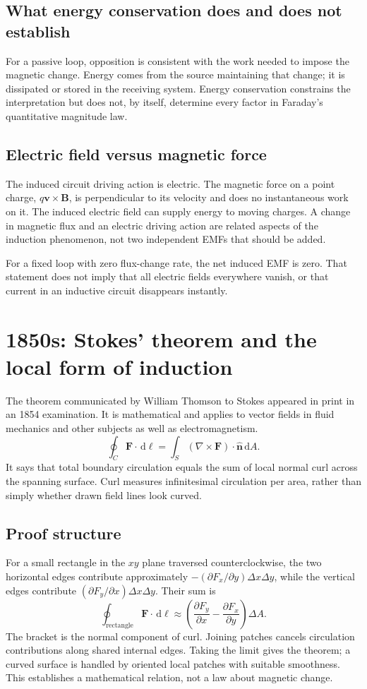 \documentclass[11pt,letterpaper]{article}
\newcommand{\vect}[1]{\boldsymbol{#1}}
\newcommand{\dd}{\,\mathrm d}
\begin{document}
\subsection*{What energy conservation does and does not establish}
For a passive loop, opposition is consistent with the work needed to impose the magnetic change. Energy comes from the source maintaining that change; it is dissipated or stored in the receiving system. Energy conservation constrains the interpretation but does not, by itself, determine every factor in Faraday's quantitative magnitude law.

\subsection*{Electric field versus magnetic force}
The induced circuit driving action is electric. The magnetic force on a point charge, $q\vect v\times\vect B$, is perpendicular to its velocity and does no instantaneous work on it. The induced electric field can supply energy to moving charges. A change in magnetic flux and an electric driving action are related aspects of the induction phenomenon, not two independent EMFs that should be added.

For a fixed loop with zero flux-change rate, the net induced EMF is zero. That statement does not imply that all electric fields everywhere vanish, or that current in an inductive circuit disappears instantly.

\newpage
\section{1850s: Stokes' theorem and the local form of induction}
The theorem communicated by William Thomson to Stokes appeared in print in an 1854 examination. It is mathematical and applies to vector fields in fluid mechanics and other subjects as well as electromagnetism.\cite{tong}
\begin{equation}
\boxed{\oint_C\vect F\cdot\dd\vect\ell
=\int_S(\nabla\times\vect F)\cdot\hat{\vect n}\dd A.}
\end{equation}
It says that total boundary circulation equals the sum of local normal curl across the spanning surface. Curl measures infinitesimal circulation per area, rather than simply whether drawn field lines look curved.

\subsection*{Proof structure}
For a small rectangle in the $xy$ plane traversed counterclockwise, the two horizontal edges contribute approximately $-(\partial F_x/\partial y)\Delta x\Delta y$, while the vertical edges contribute $(\partial F_y/\partial x)\Delta x\Delta y$. Their sum is
\[
\oint_{\text{rectangle}}\vect F\cdot\dd\vect\ell
\approx\left(\frac{\partial F_y}{\partial x}-\frac{\partial F_x}{\partial y}\right)\Delta A.
\]
The bracket is the normal component of curl. Joining patches cancels circulation contributions along shared internal edges. Taking the limit gives the theorem; a curved surface is handled by oriented local patches with suitable smoothness. This establishes a mathematical relation, not a law about magnetic change.
\end{document}
